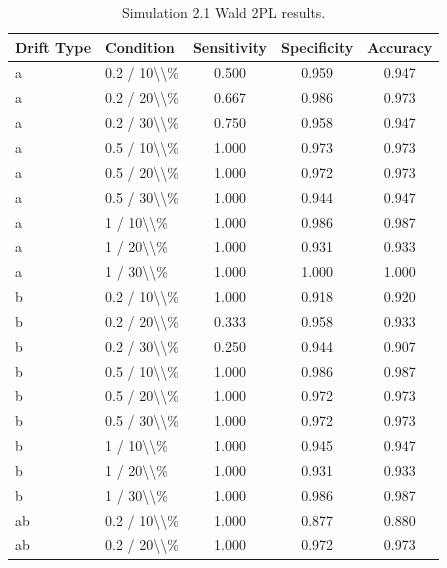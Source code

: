 \begin{table}[!h]
\centering
\caption{\label{tab:tab:sim21_2pl}Simulation 2.1 Wald 2PL results.}
\centering
\begin{tabular}[t]{llccc}
\toprule
Drift Type & Condition & Sensitivity & Specificity & Accuracy\\
\midrule
a & 0.2 / 10\textbackslash{}\textbackslash{}\% & 0.500 & 0.959 & 0.947\\
a & 0.2 / 20\textbackslash{}\textbackslash{}\% & 0.667 & 0.986 & 0.973\\
a & 0.2 / 30\textbackslash{}\textbackslash{}\% & 0.750 & 0.958 & 0.947\\
a & 0.5 / 10\textbackslash{}\textbackslash{}\% & 1.000 & 0.973 & 0.973\\
a & 0.5 / 20\textbackslash{}\textbackslash{}\% & 1.000 & 0.972 & 0.973\\
\addlinespace
a & 0.5 / 30\textbackslash{}\textbackslash{}\% & 1.000 & 0.944 & 0.947\\
a & 1 / 10\textbackslash{}\textbackslash{}\% & 1.000 & 0.986 & 0.987\\
a & 1 / 20\textbackslash{}\textbackslash{}\% & 1.000 & 0.931 & 0.933\\
a & 1 / 30\textbackslash{}\textbackslash{}\% & 1.000 & 1.000 & 1.000\\
b & 0.2 / 10\textbackslash{}\textbackslash{}\% & 1.000 & 0.918 & 0.920\\
\addlinespace
b & 0.2 / 20\textbackslash{}\textbackslash{}\% & 0.333 & 0.958 & 0.933\\
b & 0.2 / 30\textbackslash{}\textbackslash{}\% & 0.250 & 0.944 & 0.907\\
b & 0.5 / 10\textbackslash{}\textbackslash{}\% & 1.000 & 0.986 & 0.987\\
b & 0.5 / 20\textbackslash{}\textbackslash{}\% & 1.000 & 0.972 & 0.973\\
b & 0.5 / 30\textbackslash{}\textbackslash{}\% & 1.000 & 0.972 & 0.973\\
\addlinespace
b & 1 / 10\textbackslash{}\textbackslash{}\% & 1.000 & 0.945 & 0.947\\
b & 1 / 20\textbackslash{}\textbackslash{}\% & 1.000 & 0.931 & 0.933\\
b & 1 / 30\textbackslash{}\textbackslash{}\% & 1.000 & 0.986 & 0.987\\
ab & 0.2 / 10\textbackslash{}\textbackslash{}\% & 1.000 & 0.877 & 0.880\\
ab & 0.2 / 20\textbackslash{}\textbackslash{}\% & 1.000 & 0.972 & 0.973\\

\end{tabular}
\end{table}
